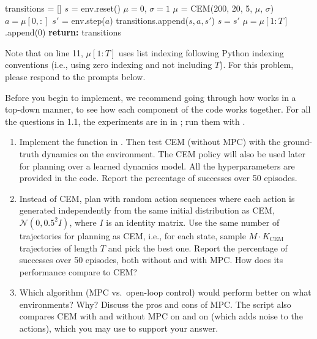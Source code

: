 \documentclass[11pt]{article}
\begin{document}
\begin{algorithm}[H]
\caption{Generating an episode using MPC}\label{alg:mpc}
\begin{algorithmic}[1]
  \State transitions = []
  \State $s$ = env.reset()
  \State $\mu = 0$, $\sigma = 1$
    \State $\mu$ = CEM(200, 20, 5, $\mu$, $\sigma$)
    \State $a = \mu[0, :]$
    \State $s'$ = env.step($a$)
    \State transitions.append($s, a, s'$)
    \State $s = s'$
    \State $\mu = \mu[1:T]$.append(0)
  \EndWhile
  \State \textbf{return:} transitions
\EndProcedure
\end{algorithmic}
\end{algorithm}

Note that on line 11, $\mu[1:T]$ uses list indexing following Python indexing conventions (i.e., using zero indexing and not including $T$). For this problem, please respond to the prompts below.

Before you begin to implement, we recommend going through how  works in a top-down manner, to see how each component of the code works together. For all the questions in 1.1, the experiments are in  in ; run them with .
\begin{enumerate}
  \item {} Implement the  function in . Then test CEM (without MPC) with the ground-truth dynamics on the  environment. The CEM policy will also be used later for planning over a learned dynamics model. All the hyperparameters are provided in the code. Report the percentage of successes over 50 episodes.
  \item {} Instead of CEM, plan with random action sequences where each action is generated independently from the same initial distribution as CEM, $\mathcal{N}(0, 0.5^2 I)$, where $I$ is an identity matrix. Use the same number of trajectories for planning as CEM, i.e., for each state, sample $M \cdot K_\text{CEM}$ trajectories of length $T$ and pick the best one. Report the percentage of successes over 50 episodes, both without and with MPC. How does its performance compare to CEM?
  \item {} Which algorithm (MPC vs.\ open-loop control) would perform better on what environments? Why? Discuss the pros and cons of MPC. The script also compares CEM with and without MPC on  and on  (which adds noise to the actions), which you may use to support your answer.
\end{enumerate}
\end{document}
